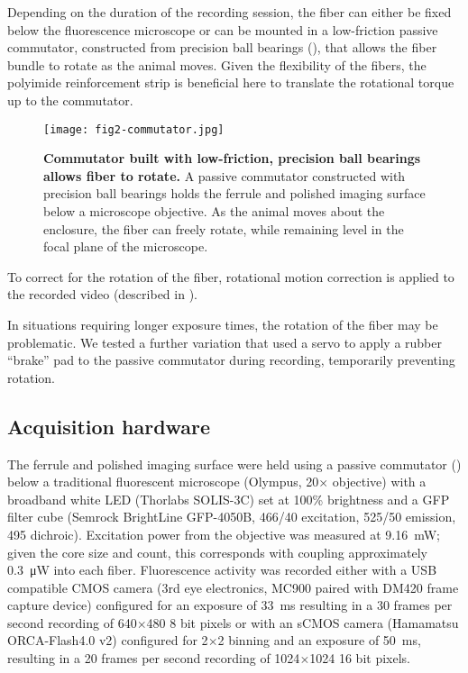 Depending on the duration of the recording session, the 
fiber can either be fixed below the fluorescence microscope 
or can be mounted in a low-friction passive commutator,
constructed from precision ball bearings (), that allows 
the fiber bundle to rotate as the animal moves. Given the 
flexibility of the fibers, the polyimide reinforcement 
strip is beneficial here to translate the rotational 
torque up to the commutator.

\begin{figure}
\texttt{[image: fig2-commutator.jpg]}
\caption[Commutator for awake behaving recording]{\textbf{Commutator
built with low-friction, precision ball bearings allows fiber to 
rotate.} A passive commutator constructed with precision ball 
bearings holds the ferrule and polished imaging surface below 
a microscope objective. As the animal moves about the enclosure,
the fiber can freely rotate, while remaining level in the focal 
plane of the microscope.}
\label{fig:commutator}
\end{figure}

To correct for the rotation of the fiber, rotational 
motion correction is applied to the recorded video 
(described in ).

In situations requiring longer exposure times, the 
rotation of the fiber may be problematic. We tested a 
further variation that used a servo to apply a rubber ``brake'' pad 
to the passive commutator during recording, temporarily 
preventing rotation.

\subsection{Acquisition hardware}

The ferrule and polished imaging surface were held 
using a passive commutator () 
below a traditional fluorescent microscope (Olympus, 
20$\times$ objective) with a broadband white LED 
(Thorlabs SOLIS-3C) set at 100\% brightness and 
a GFP filter cube (Semrock BrightLine GFP-4050B, 
466/40 excitation, 525/50 emission, 495 dichroic). 
Excitation power from the objective was measured 
at 9.16~mW; given the core size and count, this 
corresponds with coupling approximately 
0.3~\si{\micro\watt} into each 
fiber. Fluorescence activity was recorded either 
with a USB compatible CMOS camera (3rd eye 
electronics, MC900 paired with DM420 frame capture 
device) configured for an exposure of 33~ms resulting 
in a 30 frames per second recording of 640$\times$480 
8 bit pixels or with an 
sCMOS camera (Hamamatsu ORCA-Flash4.0 v2) configured 
for 2$\times$2 binning and an exposure of 50~ms, 
resulting in a 20 frames per second recording of 
1024$\times$1024 16 bit pixels.

